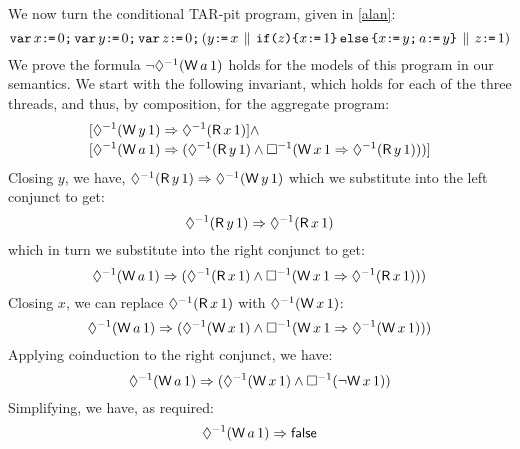 \begin{example}
We now turn the conditional TAR-pit program, given in \eqref{alan}:
\begin{equation}
  \label{alan}
  \VAR x\GETS0\SEMI \VAR y\GETS0\SEMI \VAR z\GETS0\SEMI  %
  (
    y\GETS x
  \PAR
    \IF{z}\THEN x\GETS1 \ELSE x\GETS y\SEMI a\GETS y \FI
  \PAR
    z\GETS1
  )
\end{equation}
We prove the formula
\begin{math}
  \lnot\once(\DW{a}{1})
\end{math}
holds for the models of this program in our semantics.  We start with the following invariant,
which holds for each of the three threads, and thus, by composition, for the
aggregate program:
\begin{align*}
  &[\once(\DW{y}{1}) \Rightarrow \once(\DR{x}{1})]
  \land\\[-.5ex]
  &[\once(\DW{a}{1}) \Rightarrow (\once(\DR{y}{1}) \land \always(\DW{x}{1} \Rightarrow \once(\DR{y}{1})))]
\end{align*}
Closing $y$, we have,
\begin{math}
  \once(\DR{y}{1}) \Rightarrow \once(\DW{y}{1}) %
\end{math}
which we substitute into the left conjunct to get:
\begin{displaymath}
  \once(\DR{y}{1}) \Rightarrow \once(\DR{x}{1})
\end{displaymath}
which in turn we substitute into the right conjunct to get:
\begin{displaymath}
  \once(\DW{a}{1}) \Rightarrow (\once(\DR{x}{1}) \land \always(\DW{x}{1} \Rightarrow \once(\DR{x}{1})))
\end{displaymath}
Closing $x$, we can replace $\once(\DR{x}{1})$ with $\once(\DW{x}{1})$:
\begin{displaymath}
  \once(\DW{a}{1}) \Rightarrow (\once(\DW{x}{1}) \land \always(\DW{x}{1} \Rightarrow \once(\DW{x}{1})))
\end{displaymath}
Applying coinduction to the right conjunct, we have:
\begin{displaymath}
  \once(\DW{a}{1}) \Rightarrow (\once(\DW{x}{1}) \land \always(\lnot \DW{x}{1}))
\end{displaymath}
Simplifying, we have, as required:  
\begin{displaymath}
  \once(\DW{a}{1}) \Rightarrow \FALSE
\end{displaymath}
\end{example}

